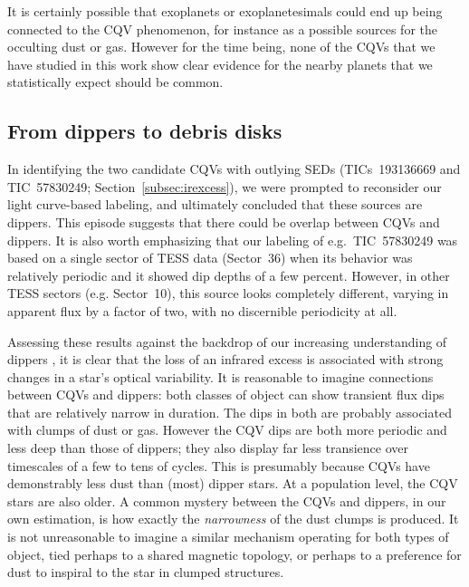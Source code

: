 \documentclass[11pt,twocolumn,tighten]{aastex63}
\begin{document}
It is certainly possible that exoplanets or exoplanetesimals could end
up being connected to the CQV phenomenon, for instance as a possible
sources for the occulting dust or gas.  However for the time being,
none of the CQVs that we have studied in this work show clear evidence
for the nearby planets that we statistically expect should be common.


\subsection{From dippers to debris disks}
\label{subsec:discdippers}

In identifying the two candidate CQVs with outlying SEDs
(TICs~193136669 and TIC~57830249; Section~\ref{subsec:irexcess}), we
were prompted to reconsider our light curve-based labeling, and
ultimately concluded that these sources are dippers.  This episode
suggests that there could be overlap between CQVs and dippers.  It is
also worth emphasizing that our labeling of e.g.~TIC~57830249 was
based on a single sector of TESS data (Sector~36) when its behavior
was relatively periodic and it showed dip depths of a few percent.
However, in other TESS sectors (e.g. Sector~10), this source looks
completely different, varying in apparent flux by a factor of two,
with no discernible periodicity at all.

Assessing these results against the backdrop of our increasing
understanding of dippers
\citep[e.g.][]{2014AJ....147...82C,2016ApJ...816...69A,2021ApJ...908...16R,2022ApJS..263...14C,2022MNRAS.514.1386G},
it is clear that the loss of an infrared excess is associated with
strong changes in a star's optical variability.  It is reasonable to
imagine connections between CQVs and dippers: both classes of object
can show transient flux dips that are relatively narrow in duration.
The dips in both are probably associated with clumps of dust or gas.
However the CQV dips are both more periodic and less deep than those
of dippers; they also display far less transience over timescales of a
few to tens of cycles.  This is presumably because CQVs have
demonstrably less dust than (most) dipper stars.  At a population
level, the CQV stars are also older.  A common mystery between the
CQVs and dippers, in our own estimation, is how exactly the {\it
narrowness} of the dust clumps is produced.  It is not unreasonable to
imagine a similar mechanism operating for both types of object, tied
perhaps to a shared magnetic topology, or perhaps to a preference for
dust to inspiral to the star in clumped structures.
\end{document}
